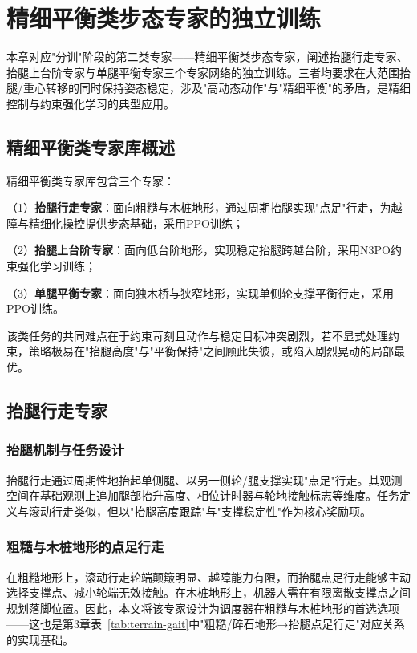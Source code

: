 
\chapter[精细平衡类步态专家的独立训练]{精细平衡类步态专家的独立训练}
\label{cha:fine-experts}

本章对应"分训"阶段的第二类专家——精细平衡类步态专家，阐述抬腿行走专家、抬腿上台阶专家与单腿平衡专家三个专家网络的独立训练。三者均要求在大范围抬腿/重心转移的同时保持姿态稳定，涉及"高动态动作"与"精细平衡"的矛盾，是精细控制与约束强化学习的典型应用。

\section{精细平衡类专家库概述}

精细平衡类专家库包含三个专家：

（1）\textbf{抬腿行走专家}：面向粗糙与木桩地形，通过周期抬腿实现"点足"行走，为越障与精细化操控提供步态基础，采用PPO训练；

（2）\textbf{抬腿上台阶专家}：面向低台阶地形，实现稳定抬腿跨越台阶，采用N3PO约束强化学习训练；

（3）\textbf{单腿平衡专家}：面向独木桥与狭窄地形，实现单侧轮支撑平衡行走，采用PPO训练。

该类任务的共同难点在于约束苛刻且动作与稳定目标冲突剧烈，若不显式处理约束，策略极易在"抬腿高度"与"平衡保持"之间顾此失彼，或陷入剧烈晃动的局部最优。

\section{抬腿行走专家}

\subsection{抬腿机制与任务设计}

抬腿行走通过周期性地抬起单侧腿、以另一侧轮/腿支撑实现"点足"行走。其观测空间在基础观测上追加腿部抬升高度、相位计时器与轮地接触标志等维度。任务定义与滚动行走类似，但以"抬腿高度跟踪"与"支撑稳定性"作为核心奖励项。

\subsection{粗糙与木桩地形的点足行走}

在粗糙地形上，滚动行走轮端颠簸明显、越障能力有限，而抬腿点足行走能够主动选择支撑点、减小轮端无效接触。在木桩地形上，机器人需在有限离散支撑点之间规划落脚位置。因此，本文将该专家设计为调度器在粗糙与木桩地形的首选选项——这也是第3章表~\ref{tab:terrain-gait}中"粗糙/碎石地形→抬腿点足行走"对应关系的实现基础。

